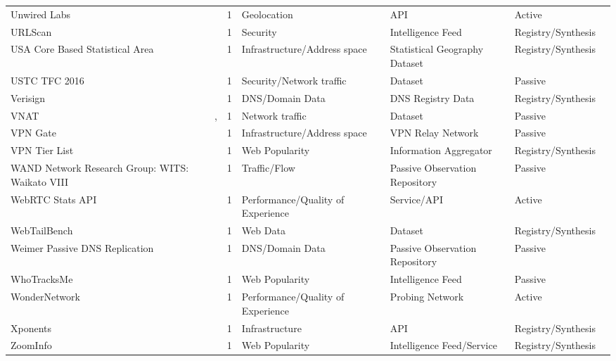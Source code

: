 \documentclass[11pt,a4paper]{article}
\begin{document}
\begin{longtable}{@{}p{}p{}p{}p{}p{}p{}p{}@{}}
Unwired Labs & \cite{unwiredlabs} & 1 & Geolocation & API & Active & \cite{10.1145/3777912.3839813} \\
URLScan & \cite{urlscan} & 1 & Security & Intelligence Feed & Registry/Synthesis & \cite{10.1145/3777912.3809151} \\
USA Core Based Statistical Area & \cite{ucbsb} & 1 & Infrastructure/Address space & Statistical Geography Dataset & Registry/Synthesis & \cite{10.1007/978-3-030-72582-2_15} \\
USTC TFC 2016 & \cite{7899588} & 1 & Security/Network traffic & Dataset & Passive & \cite{10.1145/3777912.3839833} \\
Verisign & \cite{verisign} & 1 & DNS/Domain Data & DNS Registry Data & Registry/Synthesis & \cite{10.1145/3517745.3561434} \\
VNAT & \cite{10044382}, \cite{vnat} & 1 & Network traffic & Dataset & Passive & \cite{10.1145/3777912.3839833} \\
VPN Gate & \cite{2616448.2616470} & 1 & Infrastructure/Address space & VPN Relay Network & Passive & \cite{10.1007/978-3-030-98785-5_23} \\
VPN Tier List & \cite{vpntierlist} & 1 & Web Popularity & Information Aggregator & Registry/Synthesis & \cite{10.1007/978-3-031-28486-1_3} \\
WAND Network Research Group: WITS: Waikato VIII & \cite{wand} & 1 & Traffic/Flow & Passive Observation Repository & Passive & \cite{10.1007/978-3-030-72582-2_32} \\
WebRTC Stats API & \cite{webrtc} & 1 & Performance/Quality of Experience & Service/API & Active & \cite{10.1145/3487552.3487842} \\
WebTailBench & \cite{webtailbench} & 1 & Web Data & Dataset & Registry/Synthesis & \cite{10.1145/3777912.3839788} \\
Weimer Passive DNS Replication & \cite{pdns} & 1 & DNS/Domain Data & Passive Observation Repository & Passive & \cite{10.1145/3517745.3561431} \\
WhoTracksMe & \cite{whotracksme} & 1 & Web Popularity & Intelligence Feed & Passive & \cite{10.1145/3730567.3764427} \\
WonderNetwork & \cite{wonder} & 1 & Performance/Quality of Experience & Probing Network & Active & \cite{10.1145/3730567.3764427} \\
Xponents & \cite{xponent} & 1 & Infrastructure & API & Registry/Synthesis & \cite{10.1145/3618257.3624816} \\
ZoomInfo & \cite{zoominfo} & 1 & Web Popularity & Intelligence Feed/Service & Registry/Synthesis & \cite{10.1145/3487552.3487853} \\

\end{longtable}
\end{document}
